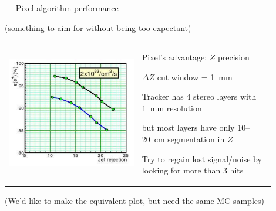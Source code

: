 \documentclass[landscape]{article}
\newenvironment{slide}[1][ ]{\mbox{\bf #1 } \vfill}{\vfill \mbox{ } \hfill \Large \arabic{page} \pagebreak}
\begin{document}
\begin{slide}
Pixel algorithm performance

(something to aim for without being too expectant)

\vspace{1 cm}

\begin{center}
\begin{tabular}{p{0.45\linewidth} p{0.45\linewidth}}
\begin{minipage}{\linewidth}
\begin{center}
\includegraphics[width=\linewidth]{pixel_performance}
\end{center}
\end{minipage} &
\begin{minipage}{\linewidth}

Pixel's advantage: $Z$ precision

$\Delta Z$ cut window = 1~mm

\vspace{1 cm}

Tracker has 4 stereo layers with 1~mm resolution

\vspace{0.5 cm}

but most layers have only 10--20~cm segmentation in $Z$

\vspace{1 cm}
Try to regain lost signal/noise by looking for more than 3 hits

\end{minipage}
\end{tabular}
\end{center}

\vspace{1 cm}
(We'd like to make the equivalent plot, but need the same MC samples)
\end{slide}
\end{document}
